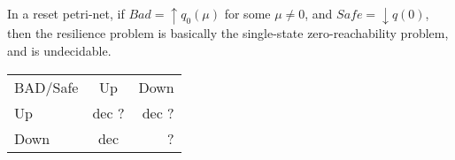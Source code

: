 In a reset petri-net, if $Bad = \uparrow q_0(\mu)$ for some $\mu \neq 0$,
and $Safe = \downarrow q(0)$,
then the resilience problem is basically the single-state zero-reachability problem, and is undecidable.





\begin{tabular}{ l c r }
   BAD/Safe & Up & Down \\
   Up & dec ? & dec ? \\
   Down & dec & ? \\
 \end{tabular}




